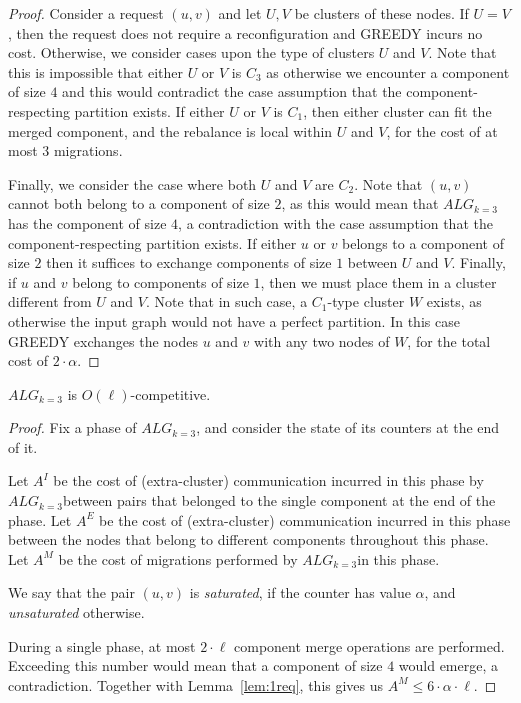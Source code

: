 \documentclass[manuscript,screen=true]{acmart}
\newcommand{\TAlg}{{\ensuremath{ALG_{k=3}}}} %
\begin{document}
\begin{appendix}
\begin{proof}
      Consider a request $(u, v)$ and let $U, V$ be clusters of these nodes.
      If $U=V$, then the request does not require a reconfiguration and GREEDY incurs no cost.
      Otherwise, we consider cases upon the type of clusters $U$ and $V$.
      Note that this is impossible that either $U$ or $V$ is $C_3$ as otherwise we encounter a component of size $4$ and this would contradict the case assumption that the component-respecting partition exists.
      If either $U$ or $V$ is $C_1$, then either cluster can fit the merged component, and the rebalance is local within $U$ and $V$, for the cost of at most $3$ migrations.
    
      Finally, we consider the case where both $U$ and $V$ are $C_2$. Note that $(u,v)$ cannot both belong to a component of size $2$, as this would mean that \TAlg{} has the component of size $4$, a contradiction with the case assumption that the component-respecting partition exists. 
      If either $u$ or $v$ belongs to a component of size $2$ then it suffices to exchange components of size $1$ between $U$ and $V$.
      Finally, if $u$ and $v$ belong to components of size $1$, then we must place them in a cluster different from $U$ and $V$.
      Note that in such case, a $C_1$-type cluster $W$ exists, as otherwise the input graph would not have a perfect partition. In this case GREEDY exchanges the nodes $u$ and $v$ with any two nodes of $W$, for the total cost of $2\cdot \alpha$.
  \end{proof}
  
  
  \begin{theorem}
    \TAlg{} is $O(\ell)$-competitive.
  \end{theorem}
  \begin{proof}
    Fix a phase of \TAlg, and consider the state of its counters at the end of it.

    Let $A^I$ be the cost of (extra-cluster) communication incurred in this phase by \TAlg between pairs that belonged to the single component at the end of the phase.
    Let $A^E$ be the cost of (extra-cluster) communication incurred in this phase between the nodes that belong to different components throughout this phase.
    Let $A^M$ be the cost of migrations performed by \TAlg in this phase.

    We say that the pair $(u, v)$ is \emph{saturated}, if the counter has value $\alpha$, and \emph{unsaturated} otherwise.
    

    During a single phase, at most $2\cdot \ell$ component merge operations are performed.
    Exceeding this number would mean that a component of size $4$ would emerge, a contradiction.
    Together with Lemma~\ref{lem:1req}, this gives us $A^M \leq 6\cdot\alpha\cdot\ell$.
    

\end{proof}
\end{appendix}
\end{document}
